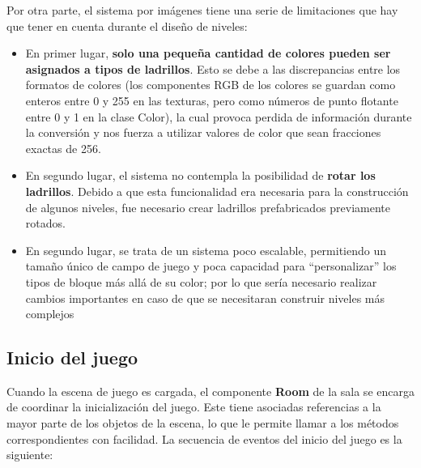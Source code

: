 Por otra parte, el sistema por imágenes tiene una serie de limitaciones que hay que tener en cuenta durante el diseño de niveles:
\begin{itemize}
  \item En primer lugar, \textbf{solo una pequeña cantidad de colores pueden ser asignados a tipos de ladrillos}. Esto se debe a las discrepancias entre los formatos de colores (los componentes RGB de los colores se guardan como enteros entre 0 y 255 en las texturas, pero como números de punto flotante entre 0 y 1 en la clase Color), la cual provoca perdida de información durante la conversión y nos fuerza a utilizar valores de color que sean fracciones exactas de 256. 
  \item En segundo lugar, el sistema no contempla la posibilidad de \textbf{rotar los ladrillos}. Debido a que esta funcionalidad era necesaria para la construcción de algunos niveles, fue necesario crear ladrillos prefabricados previamente rotados.
  \item En segundo lugar, se trata de un sistema poco escalable, permitiendo un tamaño único de campo de juego y poca capacidad para ``personalizar'' los tipos de bloque más allá de su color; por lo que sería necesario realizar cambios importantes en caso de que se necesitaran construir niveles más complejos
\end{itemize}

\subsection{Inicio del juego}
Cuando la escena de juego es cargada, el componente \textbf{Room} de la sala se encarga de coordinar la inicialización del juego. Este tiene asociadas referencias a la mayor parte de los objetos de la escena, lo que le permite llamar a los métodos correspondientes con facilidad. La secuencia de eventos del inicio del juego es la siguiente:

